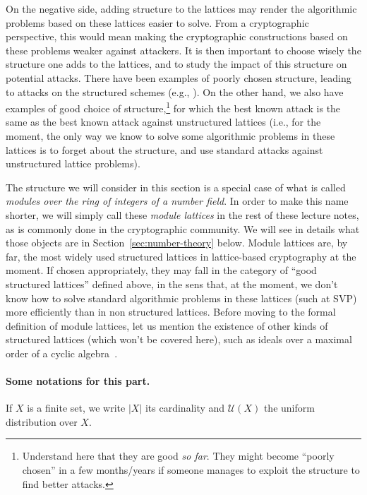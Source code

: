 On the negative side, adding structure to the lattices may render the algorithmic problems based on these lattices easier to solve. From a cryptographic perspective, this would mean making the cryptographic constructions based on these problems weaker against attackers. It is then important to choose wisely the structure one adds to the lattices, and to study the impact of this structure on potential attacks.
There have been examples of poorly chosen structure, leading to attacks on the structured schemes  (e.g., \cite{Gentry01, BCV20}).
On the other hand, we also have examples of good choice of structure,\footnote{Understand here that they are good \emph{so far}. They might become ``poorly chosen'' in a few months/years if someone manages to exploit the structure to find better attacks.} for which the best known attack is the same as the best known attack against unstructured lattices (i.e., for the moment, the only way we know to solve some algorithmic problems in these lattices is to forget about the structure, and use standard attacks against unstructured lattice problems).

The structure we will consider in this section is a special case of what is called \emph{modules over the ring of integers of a number field}. In order to make this name shorter, we will simply call these \emph{module lattices} in the rest of these lecture notes, as is commonly done in the cryptographic community. We will see in details what those objects are in Section~\ref{sec:number-theory} below. Module lattices are, by far, the most widely used structured lattices in lattice-based cryptography at the moment. If chosen appropriately, they may fall in the category of ``good structured lattices'' defined above, in the sens that, at the moment, we don't know how to solve standard algorithmic problems in these lattices (such at SVP) more efficiently than in non structured lattices.
Before moving to the formal definition of module lattices, let us mention the existence of other kinds of structured lattices (which won't be covered here), such as ideals over a maximal order of a cyclic algebra~\cite{CLWE}.

\paragraph{Some notations for this part.} If $X$ is a finite set, we write $|X|$ its cardinality and $\mathcal{U}(X)$ the uniform distribution over $X$.


